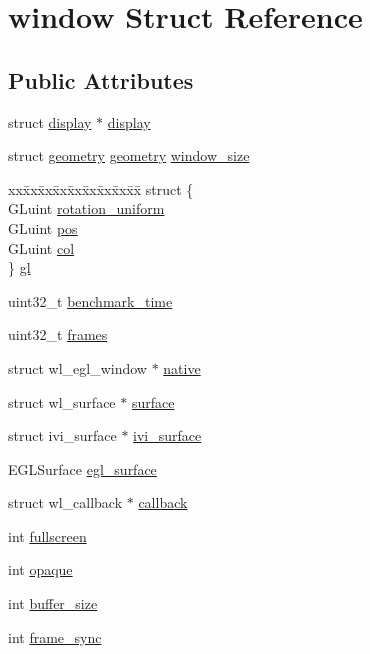 \hypertarget{structwindow}{}\section{window Struct Reference}
\label{structwindow}
\subsection*{Public Attributes}
\begin{DoxyCompactItemize}
\item 
struct \hyperlink{structdisplay}{display} $\ast$ \hyperlink{structwindow_a129486f2bd23791194f389ca1405cfd4}{display}
\item 
struct \hyperlink{structgeometry}{geometry} \hyperlink{structgeometry}{geometry} \hyperlink{structwindow_ad2b6c8ed8044b41fd1189a0ce26d539a}{window\+\_\+size}
\item 
\begin{tabbing}
xx\=xx\=xx\=xx\=xx\=xx\=xx\=xx\=xx\=\kill
struct \{\\
\>GLuint \hyperlink{structwindow_a5202f3b60e262a6fa4fcee68dd47cb67}{rotation\_uniform}\\
\>GLuint \hyperlink{structwindow_aaf965f90f9fc938db2315ff62028c362}{pos}\\
\>GLuint \hyperlink{structwindow_aef10fe94766ccd4831ee611c5ad0e55c}{col}\\
\} \hyperlink{structwindow_a6975a930e9a3c166f8201fc4ef5e7728}{gl}\\

\end{tabbing}\item 
uint32\+\_\+t \hyperlink{structwindow_a72629bf021a361ad900504732a74cb68}{benchmark\+\_\+time}
\item 
uint32\+\_\+t \hyperlink{structwindow_a633864bb495ec265bee220a5c70cc98f}{frames}
\item 
struct wl\+\_\+egl\+\_\+window $\ast$ \hyperlink{structwindow_ae41be0955d0e73530e1bc13dfeb9d731}{native}
\item 
struct wl\+\_\+surface $\ast$ \hyperlink{structwindow_a7d0790cfc7c30621611fa26ab5c1ae97}{surface}
\item 
struct ivi\+\_\+surface $\ast$ \hyperlink{structwindow_a40e2c6fb4178953c820fc1b9f41d4b31}{ivi\+\_\+surface}
\item 
E\+G\+L\+Surface \hyperlink{structwindow_a8de0059f3f1cb0dec33fba1143b7dee1}{egl\+\_\+surface}
\item 
struct wl\+\_\+callback $\ast$ \hyperlink{structwindow_a35ba639556fa19d9273dad0953a6807e}{callback}
\item 
int \hyperlink{structwindow_a8da44798a9e1feb7ed3fbd18ec3a28b6}{fullscreen}
\item 
int \hyperlink{structwindow_a026a50808d8323a5a73d585c19916fa8}{opaque}
\item 
int \hyperlink{structwindow_a0e634038f669aff472012f25ea250b40}{buffer\+\_\+size}
\item 
int \hyperlink{structwindow_a851bcb65083f5ab5ff768b09522bed70}{frame\+\_\+sync}
\end{DoxyCompactItemize}


